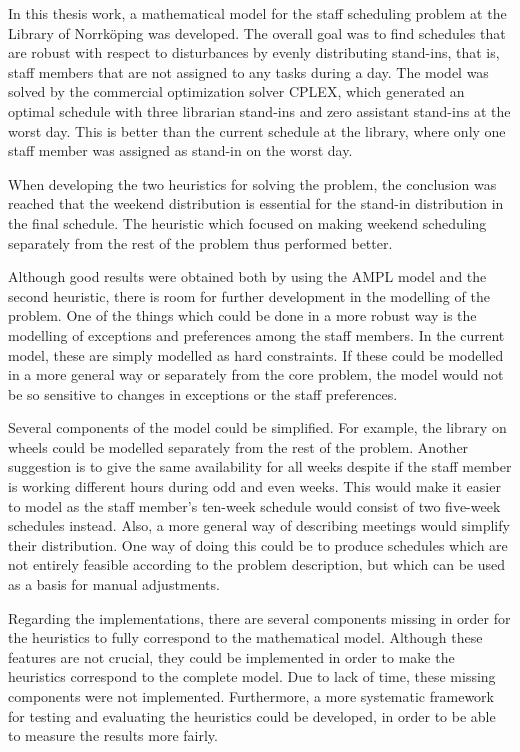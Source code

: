 In this thesis work, a mathematical model for the staff scheduling problem at the Library of Norrköping was developed. The overall goal was to find schedules that are robust with respect to disturbances by evenly distributing stand-ins, that is, staff members that are not assigned to any tasks during a day. The model was solved by the commercial optimization solver CPLEX, which generated an optimal schedule with three librarian stand-ins and zero assistant stand-ins at the worst day. This is better than the current schedule at the library, where only one staff member was assigned as stand-in on the worst day.

When developing the two heuristics for solving the problem, the conclusion was reached that the weekend distribution is essential for the stand-in distribution in the final schedule. The heuristic which focused on making weekend scheduling separately from the rest of the problem thus performed better. 

Although good results were obtained both by using the AMPL model and the second heuristic, there is room for further development in the modelling of the problem. One of the things which could be done in a more robust way is the modelling of exceptions and preferences among the staff members. In the current model, these are simply modelled as hard constraints. If these could be modelled in a more general way or separately from the core problem, the model would not be so sensitive to changes in exceptions or the staff preferences.

Several components of the model could be simplified. For example, the library on wheels could be modelled separately from the rest of the problem. Another suggestion is to give the same availability for all weeks despite if the staff member is working different hours during odd and even weeks. This would make it easier to model as the staff member's ten-week schedule would consist of two five-week schedules instead. Also, a more general way of describing meetings would simplify their distribution. One way of doing this could be to produce schedules which are not entirely feasible according to the problem description, but which can be used as a basis for manual adjustments.

Regarding the implementations, there are several components missing in order for the heuristics to fully correspond to the mathematical model. Although these features are not crucial, they could be implemented in order to make the heuristics correspond to the complete model. Due to lack of time, these missing components were not implemented. Furthermore, a more systematic framework for testing and evaluating the heuristics could be developed, in order to be able to measure the results more fairly.



